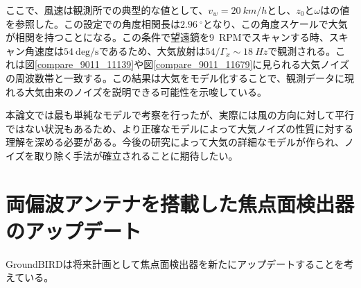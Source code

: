 ここで、風速は観測所での典型的な値として、$v_{w}=\SI{20}{km/h}$とし、$z_{0}$と$\omega$は\cite{nishinomiya}の値を参照した。この設定での角度相関長は$\SI{2.96}{^{\circ}}$となり、この角度スケールで大気が相関を持つことになる。この条件で望遠鏡を\SI{9}{RPM}でスキャンする時、スキャン角速度は$\SI{54}{\mathrm{deg/s}}$であるため、大気放射は$54/\Gamma_{x}\sim\SI{18}{Hz}$で観測される。これは図\ref{compare_9011_11139}や図\ref{compare_9011_11679}に見られる大気ノイズの周波数帯と一致する。この結果は大気をモデル化することで、観測データに現れる大気由来のノイズを説明できる可能性を示唆している。

本論文では最も単純なモデルで考察を行ったが、実際には風の方向に対して平行ではない状況もあるため、より正確なモデルによって大気ノイズの性質に対する理解を深める必要がある。今後の研究によって大気の詳細なモデルが作られ、ノイズを取り除く手法が確立されることに期待したい。
\section{両偏波アンテナを搭載した焦点面検出器のアップデート}
GroundBIRDは将来計画として焦点面検出器を新たにアップデートすることを考えている。



